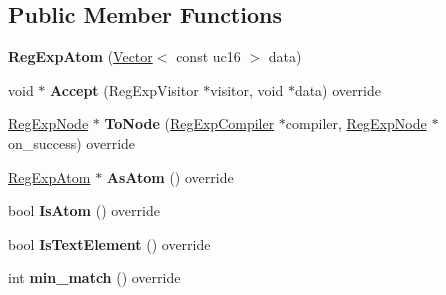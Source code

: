 \subsection*{Public Member Functions}
\begin{DoxyCompactItemize}
\item 
{\bfseries Reg\+Exp\+Atom} (\hyperlink{classv8_1_1internal_1_1_vector}{Vector}$<$ const uc16 $>$ data)\hypertarget{classv8_1_1internal_1_1_reg_exp_atom_a6b0a17525dbac9b99bcd629ef87df82a}{}\label{classv8_1_1internal_1_1_reg_exp_atom_a6b0a17525dbac9b99bcd629ef87df82a}

\item 
void $\ast$ {\bfseries Accept} (Reg\+Exp\+Visitor $\ast$visitor, void $\ast$data) override\hypertarget{classv8_1_1internal_1_1_reg_exp_atom_a6253a05cceb1cce4c15e0f51c346c672}{}\label{classv8_1_1internal_1_1_reg_exp_atom_a6253a05cceb1cce4c15e0f51c346c672}

\item 
\hyperlink{classv8_1_1internal_1_1_reg_exp_node}{Reg\+Exp\+Node} $\ast$ {\bfseries To\+Node} (\hyperlink{classv8_1_1internal_1_1_reg_exp_compiler}{Reg\+Exp\+Compiler} $\ast$compiler, \hyperlink{classv8_1_1internal_1_1_reg_exp_node}{Reg\+Exp\+Node} $\ast$on\+\_\+success) override\hypertarget{classv8_1_1internal_1_1_reg_exp_atom_a07be7d527e723b4ac3f97cbd9dcb56be}{}\label{classv8_1_1internal_1_1_reg_exp_atom_a07be7d527e723b4ac3f97cbd9dcb56be}

\item 
\hyperlink{classv8_1_1internal_1_1_reg_exp_atom}{Reg\+Exp\+Atom} $\ast$ {\bfseries As\+Atom} () override\hypertarget{classv8_1_1internal_1_1_reg_exp_atom_ade1d632ac7774d218cd6fa80eac243a3}{}\label{classv8_1_1internal_1_1_reg_exp_atom_ade1d632ac7774d218cd6fa80eac243a3}

\item 
bool {\bfseries Is\+Atom} () override\hypertarget{classv8_1_1internal_1_1_reg_exp_atom_a4bf1387c9f206031a52f02c03941a356}{}\label{classv8_1_1internal_1_1_reg_exp_atom_a4bf1387c9f206031a52f02c03941a356}

\item 
bool {\bfseries Is\+Text\+Element} () override\hypertarget{classv8_1_1internal_1_1_reg_exp_atom_acfc9c7c2539407e68f02da0190472344}{}\label{classv8_1_1internal_1_1_reg_exp_atom_acfc9c7c2539407e68f02da0190472344}

\item 
int {\bfseries min\+\_\+match} () override\hypertarget{classv8_1_1internal_1_1_reg_exp_atom_a39cacb200d9f087749266f85fa4c0d93}{}\label{classv8_1_1internal_1_1_reg_exp_atom_a39cacb200d9f087749266f85fa4c0d93}


\end{DoxyCompactItemize}
